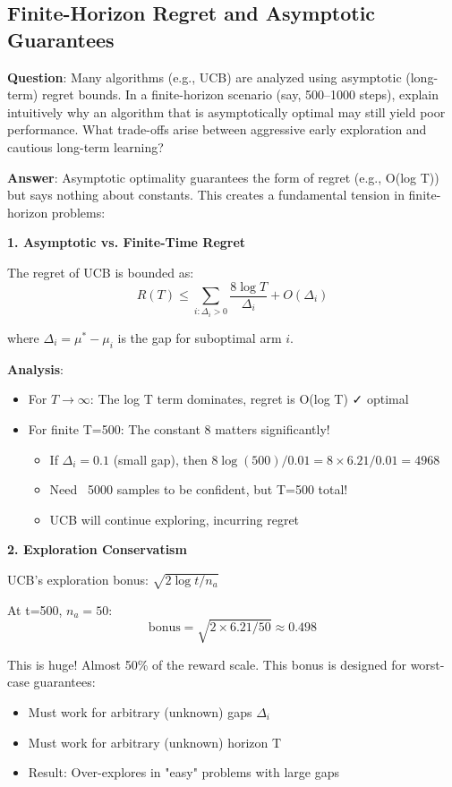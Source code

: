 \documentclass[12pt]{article}
\begin{document}
{{{\subsection{Finite-Horizon Regret and Asymptotic Guarantees}

\textbf{Question}: Many algorithms (e.g., UCB) are analyzed using asymptotic (long-term) regret bounds. In a finite-horizon scenario (say, 500–1000 steps), explain intuitively why an algorithm that is asymptotically optimal may still yield poor performance. What trade-offs arise between aggressive early exploration and cautious long-term learning?

\textbf{Answer}: Asymptotic optimality guarantees the form of regret (e.g., O(log T)) but says nothing about constants. This creates a fundamental tension in finite-horizon problems:

\textbf{1. Asymptotic vs. Finite-Time Regret}

The regret of UCB is bounded as:
\begin{equation}
R(T) \leq \sum_{i: \Delta_i > 0} \frac{8 \log T}{\Delta_i} + O(\Delta_i)
\end{equation}

where $\Delta_i = \mu^* - \mu_i$ is the gap for suboptimal arm $i$.

\textbf{Analysis}:
\begin{itemize}
\item For $T \to \infty$: The log T term dominates, regret is O(log T) ✓ optimal
\item For finite T=500: The constant 8 matters significantly!
  \begin{itemize}
  \item If $\Delta_i = 0.1$ (small gap), then $8 \log(500) / 0.01 = 8 \times 6.21 / 0.01 = 4968$
  \item Need ~5000 samples to be confident, but T=500 total!
  \item UCB will continue exploring, incurring regret
  \end{itemize}
\end{itemize}

\textbf{2. Exploration Conservatism}

UCB's exploration bonus: $\sqrt{2 \log t / n_a}$

At t=500, $n_a=50$:
\begin{equation}
\text{bonus} = \sqrt{2 \times 6.21 / 50} \approx 0.498
\end{equation}

This is huge! Almost 50\% of the reward scale. This bonus is designed for worst-case guarantees:
\begin{itemize}
\item Must work for arbitrary (unknown) gaps $\Delta_i$
\item Must work for arbitrary (unknown) horizon T
\item Result: Over-explores in "easy" problems with large gaps
\end{itemize}

}}}
\end{document}
